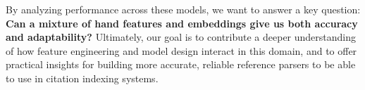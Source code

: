 By analyzing performance across these models, we want to answer a key question: \textbf{Can a mixture of hand features and embeddings give us both accuracy and adaptability?}
Ultimately, our goal is to contribute a deeper understanding of how feature engineering and model design interact in this domain, and to offer practical insights for building more accurate, reliable reference parsers to be able to use in citation indexing systems.
